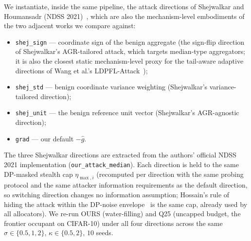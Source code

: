 \documentclass[final,1p,times]{elsarticle}
\begin{document}
We instantiate, inside the same pipeline, the attack directions of
Shejwalkar and Houmansadr (NDSS 2021)~\cite{shejwalkar2021turning}, which are
also the mechanism-level embodiments of the two adjacent works we compare
against:
\begin{itemize}
  \item \texttt{shej\_sign} --- coordinate sign of the benign aggregate
  (the sign-flip direction of Shejwalkar's AGR-tailored attack, which
  targets median-type aggregators; it is also the closest static
  mechanism-level proxy for the tail-aware adaptive directions of
  Wang et al.'s LDPFL-Attack~\cite{wang2025ldpfl});
  \item \texttt{shej\_std} --- benign coordinate variance weighting
  (Shejwalkar's variance-tailored direction);
  \item \texttt{shej\_unit} --- the benign reference unit vector
  (Shejwalkar's AGR-agnostic direction);
  \item \texttt{grad} --- our default $-\hat g$.
\end{itemize}
The three Shejwalkar directions are extracted from the authors' official
NDSS 2021 implementation (\texttt{our\_attack\_median}).
Each direction is held to the same DP-masked stealth cap
$\eta_{\max,i}$ (recomputed per direction with the same probing
protocol and the same attacker information requirements as the default
direction, so switching direction changes no information assumption;
Hossain's rule of hiding the
attack within the DP-noise envelope~\cite{hossain2025mpelm} is the same cap, already used by
all allocators). We re-run OURS (water-filling) and Q25 (uncapped budget,
the frontier occupant on CIFAR-10) under all four directions across the
same $\sigma\in\{0.5,1,2\}$, $\kappa\in\{0.5,2\}$, $10$ seeds.
\end{document}
